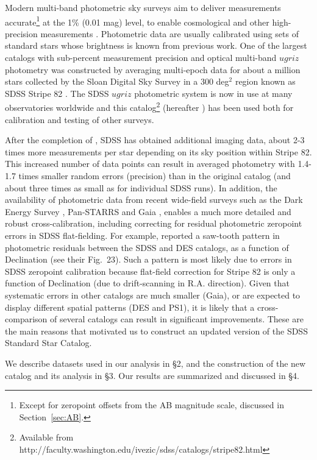 
Modern multi-band photometric sky surveys aim to deliver measurements accurate\footnote{Except for zeropoint offsets from the AB magnitude scale, discussed in Section~\ref{sec:AB}.} at the 1\% (0.01 mag) level, to 
enable cosmological and other high-precision measurements \cite[e.g., the Vera Rubin Observatory Legacy Survey of Space and Time,][]{LSSToverview}. 
Photometric data are usually calibrated using sets of standard stars whose brightness is known from previous work.
One of the largest catalogs with sub-percent measurement precision and optical multi-band $ugriz$ photometry
was constructed by averaging multi-epoch data for about a million stars collected by the Sloan Digital Sky Survey \citep[SDSS,][]{York2000}  in a 300 deg$^2$ region known as SDSS Stripe 82 \citep[][hereafter \pO]{Ivez07}. 
The SDSS $ugriz$ photometric system is now in use at many observatories worldwide and this catalog\footnote{Available from http://faculty.washington.edu/ivezic/sdss/catalogs/stripe82.html}
(hereafter \pOc) has been used both for calibration and testing of other surveys. 

After the completion of \pOc, SDSS has obtained additional imaging data, about 2-3 times more measurements 
per star depending on its sky position within Stripe 82. This increased number of data points can result in averaged photometry with
1.4-1.7 times smaller random errors (precision) than in the original catalog (and about three times as small as for individual 
SDSS runs). In addition, the availability of photometric data from recent wide-field surveys such as the 
Dark Energy Survey \citep[DES,][]{2016MNRAS.460.1270D}, Pan-STARRS \citep[PS1,][]{2010SPIE.7733E..0EK} and Gaia \citep{2018A&A...616A...1G}, enables a much more detailed and robust cross-calibration, including
correcting for residual photometric zeropoint errors in SDSS flat-fielding. For example, \cite{2013A&A...552A.124B}
reported a saw-tooth pattern in photometric residuals between the SDSS and DES catalogs, as a function of Declination
(see their Fig.~23). Such a pattern is most likely due to errors in SDSS zeropoint calibration because
flat-field correction for Stripe 82 is only a function of Declination (due to drift-scanning in R.A. direction). 
Given that systematic errors in other catalogs are much smaller (Gaia), or are expected to display different 
spatial patterns (DES and PS1), it is likely that a cross-comparison of several catalogs can result in
significant improvements. These are the main reasons that motivated us to construct an updated version of the 
SDSS Standard Star Catalog. 

We describe datasets used in our analysis in \S2, and the construction of the new catalog and its analysis in \S3. 
Our results are summarized and discussed in \S4. 